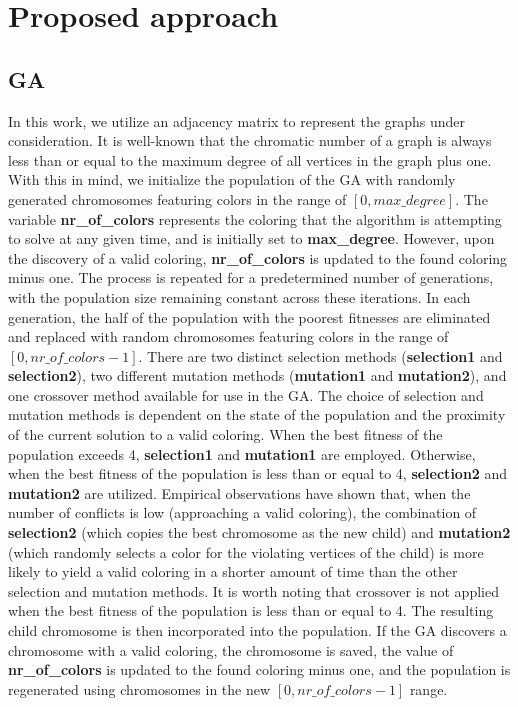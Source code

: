 \documentclass[10pt]{article}
\begin{document}
\section{Proposed approach}
\subsection{GA} In this work, we utilize an adjacency matrix to represent the graphs under consideration. It is well-known that the chromatic number of a graph is always less than or equal to the maximum degree of all vertices in the graph plus one. With this in mind, we initialize the population of the GA with randomly generated chromosomes featuring colors in the range of $[0,max\_degree]$. The variable \textbf{nr\_of\_colors} represents the coloring that the algorithm is attempting to solve at any given time, and is initially set to \textbf{max\_degree}. However, upon the discovery of a valid coloring, \textbf{nr\_of\_colors} is updated to the found coloring minus one. The process is repeated for a predetermined number of generations, with the population size remaining constant across these iterations. In each generation, the half of the population with the poorest fitnesses are eliminated and replaced with random chromosomes featuring colors in the range of $[0,nr\_of\_colors-1]$.
There are two distinct selection methods (\textbf{selection1} and \textbf{selection2}), two different mutation methods (\textbf{mutation1} and \textbf{mutation2}), and one crossover method available for use in the GA. The choice of selection and mutation methods is dependent on the state of the population and the proximity of the current solution to a valid coloring. When the best fitness of the population exceeds 4, \textbf{selection1} and \textbf{mutation1} are employed. Otherwise, when the best fitness of the population is less than or equal to 4, \textbf{selection2} and \textbf{mutation2} are utilized.
Empirical observations have shown that, when the number of conflicts is low (approaching a valid coloring), the combination of \textbf{selection2} (which copies the best chromosome as the new child) and \textbf{mutation2} (which randomly selects a color for the violating vertices of the child) is more likely to yield a valid coloring in a shorter amount of time than the other selection and mutation methods. It is worth noting that crossover is not applied when the best fitness of the population is less than or equal to 4. The resulting child chromosome is then incorporated into the population.
If the GA discovers a chromosome with a valid coloring, the chromosome is saved, the value of \textbf{nr\_of\_colors} is updated to the found coloring minus one, and the population is regenerated using chromosomes in the new $[0,nr\_of\_colors-1]$ range.
\end{document}
